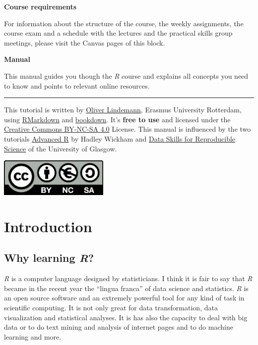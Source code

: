 \documentclass[
]{scrartcl}
\begin{document}
\textbf{Course requirements}

For information about the structure of the course, the weekly assignments, the course exam and a schedule with the lectures and the practical skills group meetings, please visit the Canvas pages of this block.

\textbf{Manual}

This manual guides you though the \emph{R} course and explains all concepts you need to know and points to relevant online resources.

\vfill

\begin{center}\rule{0.5\linewidth}{0.5pt}\end{center}

This tutorial is written by \href{http://cognitive-psychology.eu/lindemann}{Oliver Lindemann}, Erasmus University Rotterdam, using \href{https://rmarkdown.rstudio.com/}{RMarkdown} and \href{https://bookdown.org/}{bookdown}. It's \textbf{free to use} and licensed under the \href{https://creativecommons.org/licenses/by-nc-sa/4.0/}{Creative Commons BY-NC-SA 4.0} License. This manual is influenced by the two tutorials \href{https://r4ds.had.co.nz/index.html}{Advanced R} by Hadley Wickham and \href{https://psyteachr.github.io/msc-data-skills/}{Data Skills for Reproducible Science} of the University of Glasgow.

\begin{center}\includegraphics[width=200px]{images/by-nc-sa.eu_} \end{center}

\newpage

\newpage

\hypertarget{introduction}{%
\section{Introduction}\label{introduction}}

\hypertarget{why-learning-r}{%
\subsection{\texorpdfstring{Why learning \emph{R}?}{Why learning R?}}\label{why-learning-r}}

\emph{R} is a computer language designed by statisticians. I think it is fair to say that \emph{R} became in the recent year the ``lingua franca'' of data science and statistics. \emph{R} is an open source software and an extremely powerful tool for any kind of task in scientific computing. It is not only great for data transformation, data visualization and statistical analyses. It is has also the capacity to deal with big data or to do text mining and analysis of internet pages and to do machine learning and more.
\end{document}
